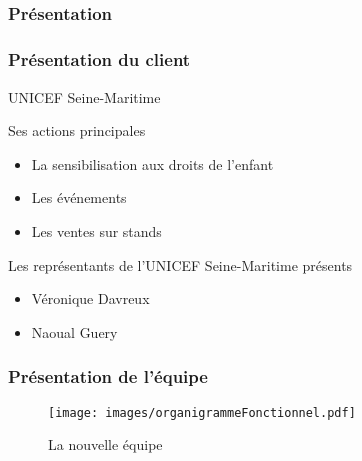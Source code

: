 \subsection{} %

\speaker{\Pierre}
\begin{frame}
\frametitle{Présentation}
	\frametitle{Présentation du client}
	\begin{center}
		UNICEF Seine-Maritime
	\end{center}

	\begin{block}{Ses actions principales}
		\begin{itemize}
			\item La sensibilisation aux droits de l'enfant
			\item Les événements 
			\item Les ventes sur stands
		\end{itemize}
	\end{block}

	\begin{block}{Les représentants de l'UNICEF Seine-Maritime présents}
		\begin{itemize}
			\item Véronique Davreux
			\item Naoual Guery
		\end{itemize}
	\end{block}
\end{frame}

\begin{frame}

\frametitle{Présentation de l'équipe}
	\begin{figure}[!h]
		\begin{center}
			\texttt{[image: images/organigrammeFonctionnel.pdf]}
			\caption{La nouvelle équipe}
		\end{center}
	\end{figure}

\end{frame}

